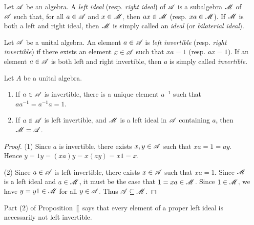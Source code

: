 \documentclass[reqno]{amsart}
\begin{document}
\begin{definition}
	Let $\mathscr{A}$ be an algebra. A \emph{left ideal} (resp. \emph{right ideal}) of $\mathscr{A}$ is a subalgebra $\mathscr{M}$ of $\mathscr{A}$ such that, for all $a \in \mathscr{A}$ and $x \in \mathscr{M}$, then $ax \in \mathscr{M}$ (resp. $xa \in \mathscr{M}$). If $\mathscr{M}$ is both a left and right ideal, then $\mathscr{M}$ is simply called an \emph{ideal} (or \emph{bilaterial ideal}).
\end{definition}

\begin{definition}
	Let $\mathscr{A}$ be a unital algebra. An element $a \in \mathscr{A}$ is \emph{left invertible} (resp. \emph{right invertible}) if there exists an element $x \in \mathscr{A}$ such that $xa = 1$ (resp. $ax = 1$). If an element $a \in \mathscr{A}$ is both left and right invertible, then $a$ is simply called \emph{invertible}.
\end{definition}

\begin{proposition}\label{prop:ideals-and-inverts}
	Let $A$ be a unital algebra.
	\mbox{}
	\begin{enumerate}[label = (\arabic*),itemsep=1pt,topsep=3pt]
		\item If $a \in \mathscr{A}$ is invertible, there is a unique element $a^{-1}$ such that $a a^{-1} = a^{-1} a = 1$.
		\item If $a \in \mathscr{A}$ is left invertible, and $\mathscr{M}$ is a left ideal in $\mathscr{A}$ containing $a$, then $\mathscr{M} = \mathscr{A}$.
	\end{enumerate}
\end{proposition}
	\begin{proof}
		(1) Since $a$ is invertible, there exists $x,y \in \mathscr{A}$ such that $xa = 1 = ay$. Hence $y=1y=(xa)y = x(ay) = x1 = x$.

		(2) Since $a \in \mathscr{A}$ is left invertible, there exists $x \in \mathscr{A}$ such that $xa = 1$. Since $\mathscr{M}$ is a left ideal and $a \in \mathscr{M}$, it must be the case that $1 = xa \in \mathscr{M}$. Since $1 \in \mathscr{M}$, we have $y = y1 \in \mathscr{M}$ for all $y \in \mathscr{A}$. Thus $\mathscr{A} \subseteq \mathscr{M}$. 
	\end{proof}

Part (2) of Proposition~\ref{} says that every element of a proper left ideal is necessarily not left invertible.
\end{document}
